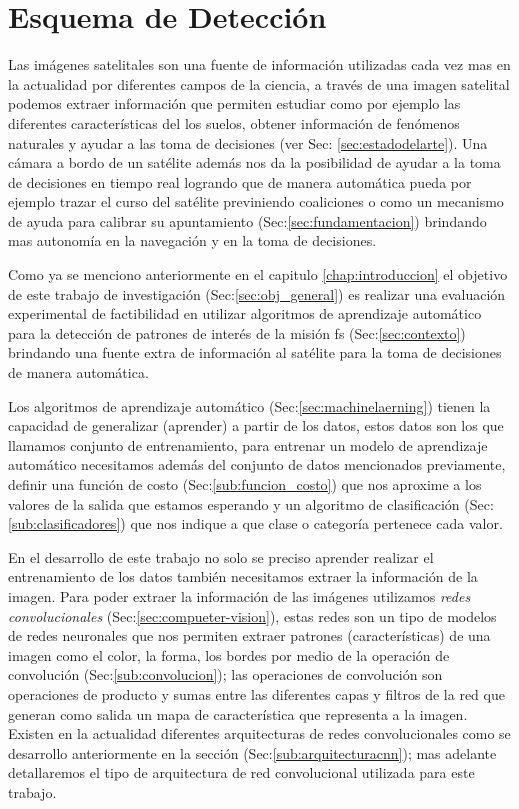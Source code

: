 \chapter{Esquema de Detección}\label{chap:tbd}

Las imágenes satelitales son una fuente de información utilizadas cada vez mas en la actualidad por diferentes campos de la ciencia, a través de una imagen satelital podemos extraer información que permiten estudiar como por ejemplo las diferentes características del los suelos, obtener información de fenómenos naturales y ayudar a las toma de decisiones (ver Sec: \ref{sec:estadodelarte}). Una cámara a bordo de un satélite además nos da la posibilidad de ayudar a la toma de decisiones en tiempo real logrando que de manera automática pueda por ejemplo trazar el curso del satélite previniendo coaliciones o como un mecanismo de ayuda para calibrar su apuntamiento (Sec:\ref{sec:fundamentacion}) brindando mas autonomía en la navegación y en la toma de decisiones. 

Como ya se menciono anteriormente en el  capitulo \ref{chap:introduccion} el objetivo de este trabajo de investigación  (Sec:\ref{sec:obj_general}) es realizar una evaluación experimental de factibilidad en utilizar algoritmos de aprendizaje automático para  la detección de patrones de interés de la misión \ac{fs} (Sec:\ref{sec:contexto})  brindando una  fuente extra de información al satélite para la toma de decisiones de manera automática. 

Los algoritmos de aprendizaje automático (Sec:\ref{sec:machinelaerning}) tienen la capacidad de generalizar (aprender)  a partir de los datos, estos datos son los que llamamos conjunto de entrenamiento, para entrenar un modelo de aprendizaje automático necesitamos además del conjunto de datos mencionados previamente, definir una función de costo (Sec:\ref{sub:funcion_costo}) que nos aproxime a los valores de la salida que estamos esperando y un algoritmo de clasificación (Sec:\ref{sub:clasificadores}) que nos indique a que clase o categoría pertenece cada valor. 

En el desarrollo de este trabajo no solo se preciso aprender realizar el entrenamiento de los datos también necesitamos extraer la información de la imagen. Para poder extraer la información de las imágenes utilizamos \textit{redes convolucionales} (Sec:\ref{sec:compueter-vision}), estas redes son un tipo de modelos de redes neuronales que nos permiten extraer patrones (características) de una imagen como el color, la forma, los bordes por medio de la operación de convolución (Sec:\ref{sub:convolucion}); las operaciones de convolución son operaciones de producto y sumas entre las diferentes capas y filtros de la red que generan como salida un mapa de característica que representa a la imagen. Existen en la actualidad diferentes arquitecturas de redes convolucionales como se desarrollo anteriormente en la sección (Sec:\ref{sub:arquitecturacnn}); mas adelante  detallaremos el tipo de arquitectura de red convolucional utilizada para este trabajo.

